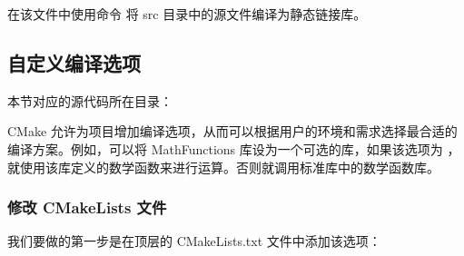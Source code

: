 \documentclass[a4paper,12pt,english]{sphinxmanual}
\begin{document}
\sphinxAtStartPar
在该文件中使用命令  将 src 目录中的源文件编译为静态链接库。


\subsection{自定义编译选项}
\label{\detokenize{dev-board/cmake:id6}}
\sphinxAtStartPar
本节对应的源代码所在目录：
\begin{quote}

\sphinxAtStartPar
{}
\end{quote}

\sphinxAtStartPar
CMake 允许为项目增加编译选项，从而可以根据用户的环境和需求选择最合适的编译方案。例如，可以将 MathFunctions 库设为一个可选的库，如果该选项为  ，就使用该库定义的数学函数来进行运算。否则就调用标准库中的数学函数库。


\subsubsection{修改 CMakeLists 文件}
\label{\detokenize{dev-board/cmake:cmakelists}}
\sphinxAtStartPar
我们要做的第一步是在顶层的 CMakeLists.txt 文件中添加该选项：
\end{document}
